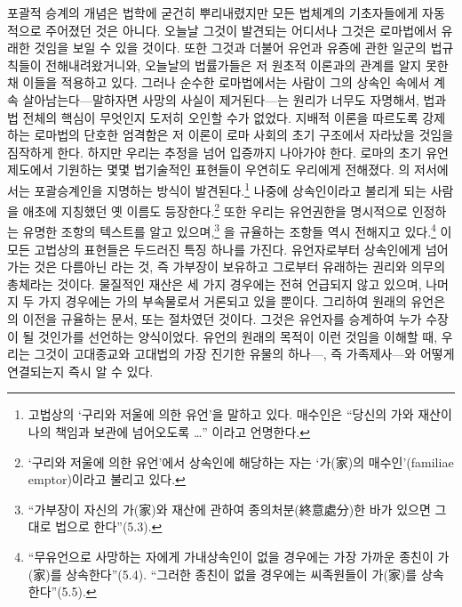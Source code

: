포괄적 승계의 개념은 법학에 굳건히 뿌리내렸지만
모든 법체계의 기초자들에게 자동적으로 주어졌던 것은 아니다.
오늘날 그것이 발견되는 어디서나 그것은 로마법에서 유래한 것임을
보일 수 있을 것이다.
또한 그것과 더불어 유언과 유증에 관한 일군의 법규칙들이 전해내려왔거니와,
오늘날의 법률가들은 저 원초적 이론과의 관계를 알지 못한 채 이들을 적용하고 있다.
그러나 순수한 로마법에서는 사람이 그의 상속인 속에서
계속 살아남는다---말하자면 사망의 사실이 제거된다---는
원리가 너무도 자명해서, 법과 법 전체의 핵심이
무엇인지 도저히 오인할 수가 없었다.
지배적 이론을 따르도록 강제하는 로마법의 단호한 엄격함은
저 이론이 로마 사회의 초기 구조에서 자라났을 것임을 짐작하게 한다.
하지만 우리는 추정을 넘어 입증까지 나아가야 한다.
로마의 초기 유언 제도에서 기원하는
몇몇 법기술적인 표현들이 우연히도 우리에게 전해졌다.
의 저서에서는 포괄승계인을 지명하는 방식이
발견된다.\footnote{%
  고법상의 `구리와 저울에 의한 유언'을 말하고 있다.
  매수인은 ``당신의 가와 재산이 나의 책임과 보관에 넘어오도록 \ldots''
  이라고 언명한다. }
나중에 상속인이라고 불리게 되는 사람을 애초에 지칭했던 옛 이름도
등장한다.\footnote{%
  `구리와 저울에 의한 유언'에서
  상속인에 해당하는 자는 `가(家)의 매수인'(familiae emptor)이라고
  불리고 있다. }
또한 우리는 유언권한을 명시적으로 인정하는
유명한  조항의 텍스트를 알고 있으며,\footnote{%
  ``가부장이 자신의 가(家)와 재산에 관하여 종의처분(終意處分)한 바가 있으면
  그대로 법으로 한다''(5.3). }
을 규율하는 조항들 역시 전해지고 있다.\footnote{``무유언으로
  사망하는 자에게 가내상속인이 없을 경우에는 가장 가까운 종친이
  가(家)를 상속한다''(5.4).
  ``그러한 종친이 없을 경우에는 씨족원들이 가(家)를 상속한다''(5.5). }
이 모든 고법상의 표현들은 두드러진 특징 하나를 가진다.
유언자로부터 상속인에게 넘어가는 것은 다름아닌 라는 것,
즉 가부장이 보유하고 그로부터 유래하는 권리와 의무의 총체라는 것이다.
물질적인 재산은 세 가지 경우에는 전혀 언급되지 않고 있으며,
나머지 두 가지 경우에는 가의 부속물로서 거론되고 있을 뿐이다.
그리하여 원래의 유언은 의 이전을 규율하는 문서,
또는  절차였던 것이다.
그것은 유언자를 승계하여 누가 수장이 될 것인가를 선언하는
양식이었다.
유언의 원래의 목적이 이런 것임을 이해할 때,
우리는 그것이 고대종교와 고대법의 가장 진기한 유물의
하나---, 즉 가족제사---와
어떻게 연결되는지 즉시 알 수 있다.

